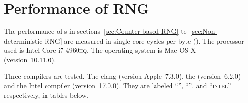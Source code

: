 %
%
%
%

\chapter{Performance of RNG}
\label{chap:Performance of RNG}

The performance of \rng{}s in sections~\ref{sec:Counter-based RNG}
to~\ref{sec:Non-deterministic RNG} are measured in single core cycles per byte
(\cpb). The processor used is Intel Core i7-4960\textsc{hq}. The operating
system is Mac OS X (version~10.11.6).

Three compilers are tested. The \llvm clang (version Apple~7.3.0), the \gnu
\gcc (version~6.2.0) and the Intel \cpp compiler (version~17.0.0). They are
labeled ``\llvm'', ``\gnu'', and ``\textsc{intel}'', respectively, in tables
below.

